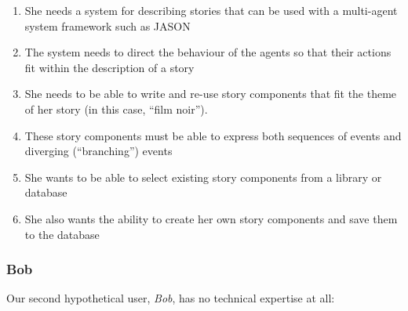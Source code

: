 \documentclass[11pt]{report}
\begin{document}
\begin{enumerate}[{Alice} R1.]
\item She needs a system for describing stories that can be used with a
  multi-agent system framework such as JASON\label{req:alice1}
\item The system needs to direct the behaviour of the agents so that their
  actions fit within the description of a story\label{req:alice2}
\item She needs to be able to write and re-use story components that fit the
  theme of her story (in this case, ``film noir'').\label{req:alice3}
\item These story components must be able to express both sequences of events
  and diverging (``branching'') events\label{req:alice4}
\item She wants to be able to select existing story components from a library or database\label{req:alice5}
\item She also wants the ability to create her own story components and save
  them to the database\label{req:alice6}
\end{enumerate}

\subsubsection{Bob}

Our second hypothetical user, \emph{Bob}, has no technical expertise at all:
\end{document}
